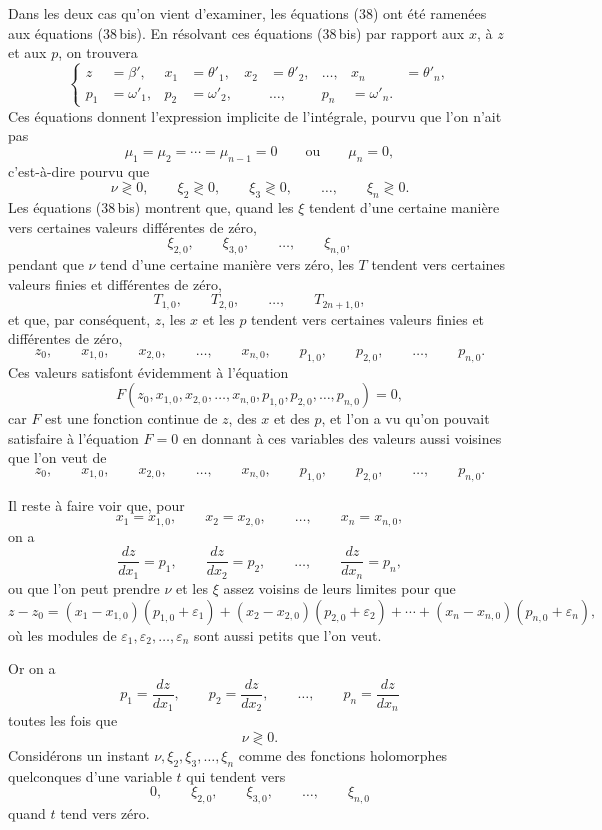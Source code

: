 \documentclass[11pt]{article}
\begin{document}
Dans les deux cas qu’on vient d’examiner, les équations (38) ont été ramenées aux équations (38\,bis). En résolvant ces équations (38\,bis) par rapport aux $x$, à $z$ et aux $p$, on trouvera
\begin{equation*}\tag{43}
\left\{
\begin{aligned}
z&=\beta',& x_1&=\theta'_1,& x_2&=\theta'_2,& \ldots,& x_n&=\theta'_n,\\
p_1&=\omega'_1,& p_2&=\omega'_2,&& \ldots,& p_n&=\omega'_n.
\end{aligned}
\right.
\end{equation*}
Ces équations donnent l’expression implicite de l’intégrale, pourvu que l’on n’ait pas
\[
\mu_1=\mu_2=\cdots=\mu_{n-1}=0\qquad \text{ou}\qquad \mu_n=0,
\]
c’est-à-dire pourvu que
\[
\nu\gtrless0,
\qquad
\xi_2\gtrless0,
\qquad
\xi_3\gtrless0,
\qquad \ldots,
\qquad
\xi_n\gtrless0.
\]
Les équations (38\,bis) montrent que, quand les $\xi$ tendent d’une certaine manière vers certaines valeurs différentes de zéro,
\[
\xi_{2,0},\qquad \xi_{3,0},\qquad \ldots,
\qquad \xi_{n,0},
\]
pendant que $\nu$ tend d’une certaine manière vers zéro, les $T$ tendent vers certaines valeurs finies et différentes de zéro,
\[
T_{1,0},\qquad T_{2,0},\qquad \ldots,\qquad T_{2n+1,0},
\]
et que, par conséquent, $z$, les $x$ et les $p$ tendent vers certaines valeurs finies et différentes de zéro,
\[
z_0,\qquad x_{1,0},\qquad x_{2,0},\qquad \ldots,
\qquad x_{n,0},\qquad p_{1,0},\qquad p_{2,0},\qquad \ldots,
\qquad p_{n,0}.
\]
Ces valeurs satisfont évidemment à l’équation
\[
F(z_0,x_{1,0},x_{2,0},\ldots,x_{n,0},p_{1,0},p_{2,0},\ldots,p_{n,0})=0,
\]
car $F$ est une fonction continue de $z$, des $x$ et des $p$, et l’on a vu qu’on pouvait satisfaire à l’équation $F=0$ en donnant à ces variables des valeurs aussi voisines que l’on veut de
\[
z_0,\qquad x_{1,0},\qquad x_{2,0},\qquad \ldots,
\qquad x_{n,0},\qquad p_{1,0},\qquad p_{2,0},\qquad \ldots,
\qquad p_{n,0}.
\]

Il reste à faire voir que, pour
\[
x_1=x_{1,0},\qquad x_2=x_{2,0},\qquad \ldots,\qquad x_n=x_{n,0},
\]
on a
\[
\frac{dz}{dx_1}=p_1,
\qquad
\frac{dz}{dx_2}=p_2,
\qquad \ldots,
\qquad
\frac{dz}{dx_n}=p_n,
\]
ou que l’on peut prendre $\nu$ et les $\xi$ assez voisins de leurs limites pour que
\[
z-z_0=(x_1-x_{1,0})(p_{1,0}+\varepsilon_1)+(x_2-x_{2,0})(p_{2,0}+\varepsilon_2)+\cdots+(x_n-x_{n,0})(p_{n,0}+\varepsilon_n),
\]
où les modules de $\varepsilon_1,\varepsilon_2,\ldots,\varepsilon_n$ sont aussi petits que l’on veut.

Or on a
\[
p_1=\frac{dz}{dx_1},
\qquad
p_2=\frac{dz}{dx_2},
\qquad \ldots,
\qquad
p_n=\frac{dz}{dx_n}
\]
toutes les fois que
\[
\nu\gtrless0.
\]
Considérons un instant $\nu,\xi_2,\xi_3,\ldots,\xi_n$ comme des fonctions holomorphes quelconques d’une variable $t$ qui tendent vers
\[
0,\qquad \xi_{2,0},\qquad \xi_{3,0},\qquad \ldots,
\qquad \xi_{n,0}
\]
quand $t$ tend vers zéro.
\end{document}
